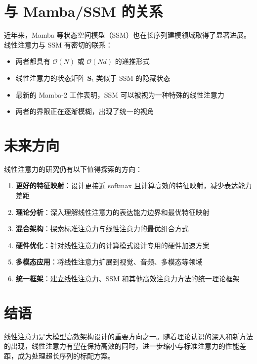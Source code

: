 \section{与 Mamba/SSM 的关系}

近年来，Mamba 等状态空间模型（SSM）也在长序列建模领域取得了显著进展。线性注意力与 SSM 有密切的联系：

\begin{itemize}
    \item 两者都具有 $\mathcal{O}(N)$ 或 $\mathcal{O}(Nd)$ 的递推形式
    \item 线性注意力的状态矩阵 $\mathbf{S}_t$ 类似于 SSM 的隐藏状态
    \item 最新的 Mamba-2 工作表明，SSM 可以被视为一种特殊的线性注意力
    \item 两者的界限正在逐渐模糊，出现了统一的视角
\end{itemize}

\section{未来方向}

线性注意力的研究仍有以下值得探索的方向：

\begin{enumerate}
    \item \textbf{更好的特征映射}：设计更接近 softmax 且计算高效的特征映射，减少表达能力差距
    \item \textbf{理论分析}：深入理解线性注意力的表达能力边界和最优特征映射
    \item \textbf{混合架构}：探索标准注意力与线性注意力的最优组合方式
    \item \textbf{硬件优化}：针对线性注意力的计算模式设计专用的硬件加速方案
    \item \textbf{多模态应用}：将线性注意力扩展到视觉、音频、多模态等领域
    \item \textbf{统一框架}：建立线性注意力、SSM 和其他高效注意力方法的统一理论框架
\end{enumerate}

\section{结语}

线性注意力是大模型高效架构设计的重要方向之一。随着理论认识的深入和新方法的出现，线性注意力有望在保持高效的同时，进一步缩小与标准注意力的性能差距，成为处理超长序列的标配方案。
